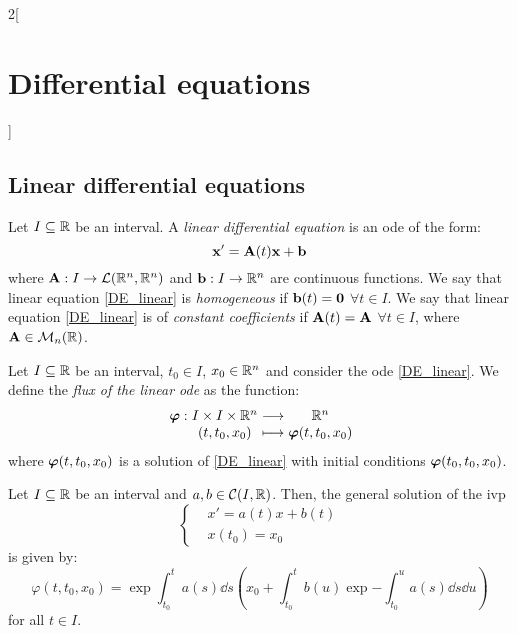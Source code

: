 \documentclass[../../../main.tex]{subfiles}
\begin{document}
\begin{multicols}{2}[\section{Differential equations}]
  \subsection{Linear differential equations}
  \begin{definition}
    Let $I\subseteq\mathbb{R}$ be an interval. A \textit{linear differential equation} is an ode of the form:
    \begin{equation}\label{DE_linear}
      \boldsymbol{\mathrm{x}}'=\boldsymbol{\mathrm{A}}(t)\boldsymbol{\mathrm{x}}+\boldsymbol{\mathrm{b}}
    \end{equation}
    where $\boldsymbol{\mathrm{A}}:I\rightarrow\mathcal{L}(\mathbb{R}^n,\mathbb{R}^n)$ and $\boldsymbol{\mathrm{b}}:I\rightarrow\mathbb{R}^n$ are continuous functions.
    We say that linear equation \eqref{DE_linear} is \textit{homogeneous} if $\boldsymbol{\mathrm{b}}(t)=\boldsymbol{\mathrm{0}}$ $\forall t\in I$. We say that linear equation \eqref{DE_linear} is of \textit{constant coefficients} if $\boldsymbol{\mathrm{A}}(t)=\boldsymbol{\mathrm{A}}$ $\forall t\in I$, where $\boldsymbol{\mathrm{A}}\in\mathcal{M}_n(\mathbb{R})$.
  \end{definition}
  \begin{definition}
    Let $I\subseteq\mathbb{R}$ be an interval, $t_0\in I$, $x_0\in\mathbb{R}^n$ and consider the ode \eqref{DE_linear}. We define the \textit{flux of the linear ode} as the function:
    $$
      \function{\vectorfunction{\varphi}}{I\times I\times \RR^n}{\RR^n}{(t,t_0,x_0)}{\vectorfunction{\varphi}(t,t_0,x_0)}
    $$
    where $\boldsymbol{\mathrm{\varphi}}(t,t_0,x_0)$ is a solution of \eqref{DE_linear} with initial conditions $\boldsymbol{\mathrm{\varphi}}(t_0,t_0,x_0)$.
  \end{definition}
  \begin{prop}
    Let $I\subseteq\mathbb{R}$ be an interval and $a,b\in\mathcal{C}(I,\mathbb{R})$. Then, the general solution of the ivp
    $$\left\{
      \begin{aligned}
         & x'      =a(t)x+b(t) \\
         & x(t_0)  =x_0
      \end{aligned}
      \right.$$
    is given by:
    \begin{equation}\label{DE_sol-lin}
      \varphi(t,t_0,x_0)=\exp{\int_{t_0}^ta(s)\dd s}\left(x_0+\int_{t_0}^tb(u)\exp{-\int_{t_0}^ua(s)\dd s}\dd u\right)
    \end{equation}
    for all $t\in I$.
  \end{prop}

\end{multicols}
\end{document}
